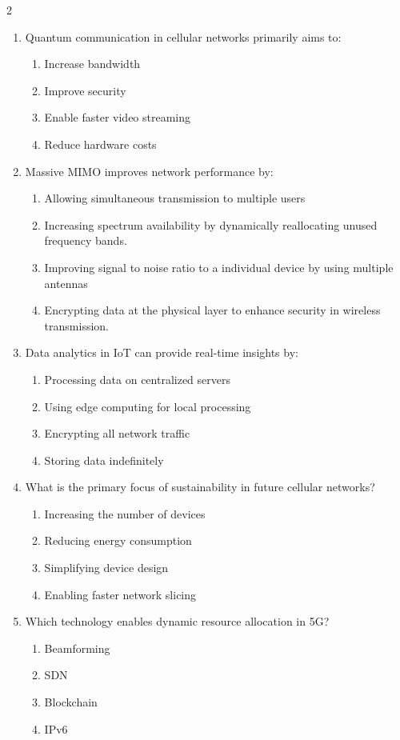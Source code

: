 \begin{multicols}{2}
\begin{enumerate}
    \item Quantum communication in cellular networks primarily aims to:
    \begin{enumerate}
        \item Increase bandwidth
        \item Improve security
        \item Enable faster video streaming
        \item Reduce hardware costs
    \end{enumerate}

    \item Massive MIMO improves network performance by:
    \begin{enumerate}
        \item Allowing simultaneous transmission to multiple users
        \item Increasing spectrum availability by dynamically reallocating unused frequency bands.
        \item Improving signal to noise ratio to a individual device by using multiple antennas
        \item Encrypting data at the physical layer to enhance security in wireless transmission.   
    \end{enumerate}
    \item Data analytics in IoT can provide real-time insights by:
    \begin{enumerate}
        \item Processing data on centralized servers
        \item Using edge computing for local processing
        \item Encrypting all network traffic
        \item Storing data indefinitely
    \end{enumerate}
    \item What is the primary focus of sustainability in future cellular networks?
    \begin{enumerate}
        \item Increasing the number of devices
        \item Reducing energy consumption
        \item Simplifying device design
        \item Enabling faster network slicing
    \end{enumerate}

    \item Which technology enables dynamic resource allocation in 5G?
    \begin{enumerate}
        \item Beamforming
        \item SDN
        \item Blockchain
        \item IPv6
    \end{enumerate}


\end{enumerate}
\end{multicols}
